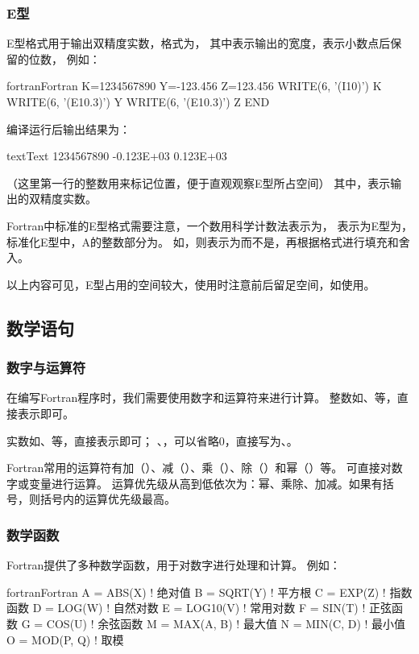 \subsubsection{E型}
E型格式用于输出双精度实数，格式为，
其中表示输出的宽度，表示小数点后保留的位数，
例如：
\begin{envcode}{fortran}{Fortran}
      K=1234567890
      Y=-123.456
      Z=123.456
      WRITE(6, '(I10)') K
      WRITE(6, '(E10.3)') Y      
      WRITE(6, '(E10.3)') Z
      END
\end{envcode}
编译运行后输出结果为：
\begin{envcode}{text}{Text}
1234567890
-0.123E+03
 0.123E+03
\end{envcode}
（这里第一行的整数用来标记位置，便于直观观察E型所占空间）
其中，表示输出的双精度实数。

Fortran中标准的E型格式需要注意，一个数用科学计数法表示为，
表示为E型为，标准化E型中，A的整数部分为。
如，则表示为而不是，再根据格式进行填充和舍入。

以上内容可见，E型占用的空间较大，使用时注意前后留足空间，如使用。



\subsection{数学语句}

\subsubsection{数字与运算符}

在编写Fortran程序时，我们需要使用数字和运算符来进行计算。
整数如、等，直接表示即可。

实数如、等，直接表示即可；
、，可以省略0，直接写为、。

Fortran常用的运算符有加（\code{+}）、减（\code{-}）、乘（\code{*}）、除（\code{/}）和幂（\code{**}）等。
可直接对数字或变量进行运算。
运算优先级从高到低依次为：幂、乘除、加减。如果有括号，则括号内的运算优先级最高。

\subsubsection{数学函数}
Fortran提供了多种数学函数，用于对数字进行处理和计算。
例如：
\begin{envcode}{fortran}{Fortran}
      A = ABS(X)       ! 绝对值
      B = SQRT(Y)      ! 平方根
      C = EXP(Z)       ! 指数函数
      D = LOG(W)       ! 自然对数
      E = LOG10(V)     ! 常用对数
      F = SIN(T)       ! 正弦函数
      G = COS(U)       ! 余弦函数
      M = MAX(A, B)    ! 最大值
      N = MIN(C, D)    ! 最小值
      O = MOD(P, Q)    ! 取模
\end{envcode}

